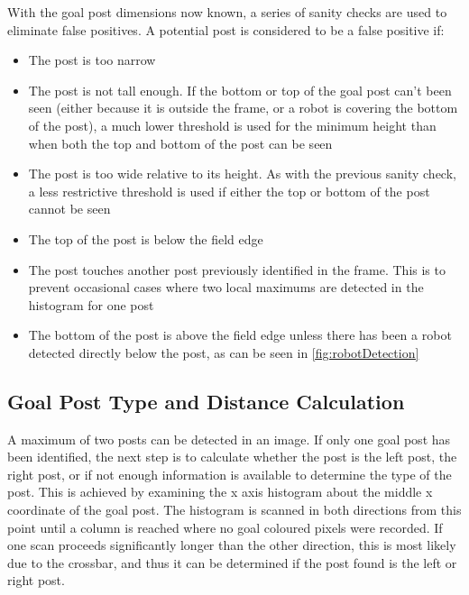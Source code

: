 \documentclass[pdftex,11pt,a4paper]{report}
\begin{document}
With the goal post dimensions now known, a series of sanity checks are used to eliminate false positives. A potential post is considered to be a false positive if:\begin{itemize}
\item{The post is too narrow}
\item{The post is not tall enough. If the bottom or top of the goal post can't been seen (either because it is outside the frame, or a robot is covering the bottom of the post), a much lower threshold is used for the minimum height than when both the top and bottom of the post can be seen}
\item{The post is too wide relative to its height. As with the previous sanity check, a less restrictive threshold is used if either the top or bottom of the post cannot be seen}
\item{The top of the post is below the field edge}
\item{The post touches another post previously identified in the frame. This is to prevent occasional cases where two local maximums are detected in the histogram for one post}
\item{The bottom of the post is above the field edge unless there has been a robot detected directly below the post, as can be seen in \autoref{fig:robotDetection}}
\end{itemize}

\subsection{Goal Post Type and Distance Calculation}

A maximum of two posts can be detected in an image. If only one goal post has been identified, the next step is to calculate whether the post is the left post, the right post, or if not enough information is available to determine the type of the post. This is achieved by examining the x axis histogram about the middle x coordinate of the goal post. The histogram is scanned in both directions from this point until a column is reached where no goal coloured pixels were recorded. If one scan proceeds significantly longer than the other direction, this is most likely due to the crossbar, and thus it can be determined if the post found is the left or right post. 
\end{document}
